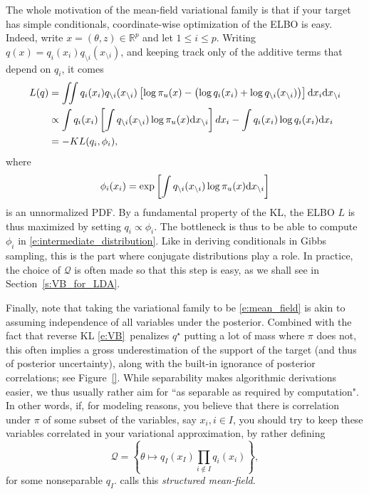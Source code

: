 The whole motivation of the mean-field variational family is that if your target has simple conditionals, coordinate-wise optimization of the ELBO is easy.
Indeed, write $x=(\theta,z) \in \mathbb{R}^p$ and let $1\leq i\leq p$. Writing $q(x) = q_i(x_i)q_{\setminus i}(x_{\setminus i})$, and keeping track only of the additive terms that depend on $q_i$, it comes
\begin{align*}
L(q)
&= \iint  q_i(x_i)q_{\setminus i}(x_{\setminus i}) \left[\log \pi_u(x) - \left( \log q_i(x_i) + \log q_{\setminus i}(x_{\setminus i}) \right)\right] \mathrm{d} x_i \mathrm{d} x_{\setminus i}\\
&\propto \int q_i(x_i) \left[ \int q_{\setminus i}(x_{\setminus i}) \log \pi_u(x) \mathrm{d} x_{\setminus i}\right] d x_i- \int q_i(x_i)\log q_i(x_i) \mathrm{d} x_i\\
&= - KL(q_i,\phi_i),
\end{align*}
where
\begin{equation}
  \label{e:intermediate_distribution}
  \phi_i(x_i) = \exp \left[\int q_{\setminus i}(x_{\setminus i}) \log \pi_u(x) \mathrm{d} x_{\setminus i}\right]
\end{equation}
is an unnormalized PDF. By a fundamental property of the KL, the ELBO $L$ is thus maximized by setting $q_i\propto \phi_i$.
The bottleneck is thus to be able to compute $\phi_i$ in \eqref{e:intermediate_distribution}.
Like in deriving conditionals in Gibbs sampling, this is the part where conjugate distributions play a role.
In practice, the choice of $\mathcal Q$ is often made so that this step is easy, as we shall see in Section~\ref{s:VB_for_LDA}.

Finally, note that taking the variational family to be \eqref{e:mean_field} is akin to assuming independence of all variables under the posterior.
Combined with the fact that reverse KL \eqref{e:VB} penalizes $q^\star$ putting a lot of mass where $\pi$ does not, this often implies a gross underestimation of the support of the target (and thus of posterior uncertainty), along with the built-in ignorance of posterior correlations; see Figure~\ref{}.
While separability makes algorithmic derivations easier, we thus usually rather aim for ``as separable as required by computation".
In other words, if, for modeling reasons, you believe that there is correlation under $\pi$ of some subset of the variables, say $x_i, i\in I$, you should try to keep these variables correlated in your variational approximation, by rather defining
$$
\mathcal Q = \left\{\theta\mapsto q_I(x_I) \prod_{i \notin I} q_i(x_i) \right\},
$$
for some nonseparable $q_I$.
\cite[Chapter 23]{Mur12} calls this \emph{structured mean-field}.

